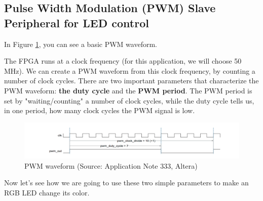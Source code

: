 \documentclass{article}
\begin{document}
\subsection{Pulse Width Modulation (PWM) Slave Peripheral for LED control}


In Figure \ref{fig:pwm_waveform}, you can see a basic PWM waveform.  

The FPGA runs at a clock frequency (for this application, we will choose 50 MHz). We can create a PWM waveform  from this clock frequency, by counting a number of clock cycles. There are two important parameters that characterize the PWM waveform: \textbf{the duty cycle} and the \textbf{PWM period}. The PWM  period is set by "waiting/counting" a number of clock cycles,  while the duty cycle  tells us, in one period, how many clock cycles the PWM signal is low.


\begin{figure}[h!]
    \centering
    \includegraphics[width=\textwidth]{img/pwm_waveform.png}
    \caption{PWM waveform (Source: Application Note 333, Altera)}
    \label{fig:pwm_waveform}
\end{figure}

Now let's see how we are going to use these two simple parameters to make an RGB LED change its color.
\end{document}
